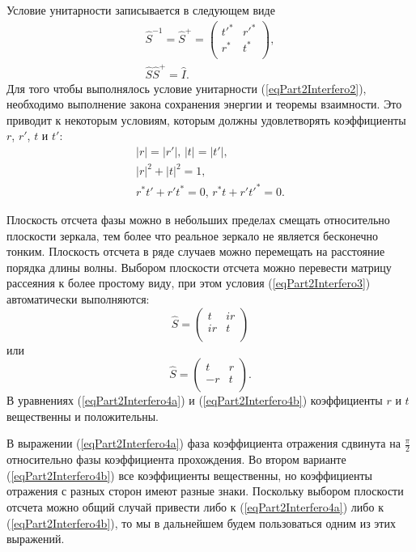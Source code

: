 Условие унитарности записывается в следующем виде
\begin{eqnarray}
\hat{S}^{-1} = 
\hat{S}^{+} = 
\left(
\begin{array}{cc}
t'^{*} & r'^{*} \\
r^{*} & t^{*} \\
\end{array}
\right), 
\nonumber \\
\hat{S} \hat{S}^{+} = \hat{I}.
\label{eqPart2Interfero2}
\end{eqnarray}
Для того чтобы выполнялось условие унитарности
(\ref{eqPart2Interfero2}), необходимо выполнение закона сохранения
энергии и теоремы взаимности. Это приводит к некоторым условиям,
которым должны удовлетворять коэффициенты $r$, $r'$, $t$ и $t'$:
\begin{eqnarray}
\left|r\right| = \left|r'\right|, \, \left|t\right| = \left|t'\right|,
\nonumber \\
\left|r\right|^2 + \left|t\right|^2 = 1, 
\nonumber \\
r^{*}t' + r't^{*} = 0, \,
r^{*}t + r't'^{*} = 0.
\label{eqPart2Interfero3}
\end{eqnarray}

Плоскость отсчета фазы можно в небольших пределах смещать относительно
плоскости зеркала, тем более что реальное зеркало не является
бесконечно тонким. Плоскость отсчета в ряде случаев можно перемещать
на расстояние порядка длины волны. Выбором плоскости отсчета можно
перевести матрицу рассеяния к более простому виду, при этом условия 
(\ref{eqPart2Interfero3}) автоматически выполняются: 
\begin{equation}
\hat{S} = \left(
\begin{array}{cc}
t & i r \\
i r & t \\
\end{array}
\right)
\label{eqPart2Interfero4a}
\end{equation}
или
\begin{equation}
\hat{S} = \left(
\begin{array}{cc}
t & r \\
-r & t \\
\end{array}
\right).
\label{eqPart2Interfero4b}
\end{equation}
В уравнениях (\ref{eqPart2Interfero4a}) и (\ref{eqPart2Interfero4b})
коэффициенты $r$ и $t$ вещественны и положительны.

В выражении (\ref{eqPart2Interfero4a}) фаза коэффициента отражения
сдвинута на $\frac{\pi}{2}$ относительно фазы коэффициента
прохождения. Во втором варианте (\ref{eqPart2Interfero4b}) все
коэффициенты вещественны, но коэффициенты отражения с разных сторон
имеют разные знаки. Поскольку выбором плоскости отсчета можно общий
случай привести либо к  (\ref{eqPart2Interfero4a}) либо к
(\ref{eqPart2Interfero4b}), то мы в дальнейшем будем пользоваться
одним из этих выражений.

